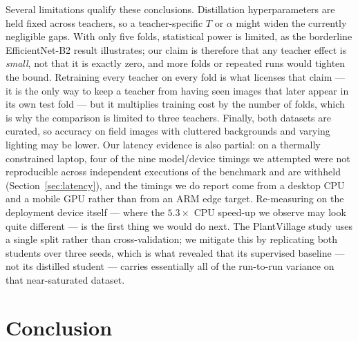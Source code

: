 \documentclass[conference]{IEEEtran}
\begin{document}
Several limitations qualify these conclusions. Distillation hyperparameters are
held fixed across teachers, so a teacher-specific $T$ or $\alpha$ might widen the
currently negligible gaps. With only five folds, statistical power is limited, as
the borderline EfficientNet-B2 result illustrates; our claim is therefore that
any teacher effect is \emph{small}, not that it is exactly zero, and more folds
or repeated runs would tighten the bound. Retraining every teacher on every fold
is what licenses that claim --- it is the only way to keep a teacher from having
seen images that later appear in its own test fold --- but it multiplies training
cost by the number of folds, which is why the comparison is limited to three
teachers. Finally, both datasets are curated, so accuracy on field images with
cluttered backgrounds and varying lighting may be lower. Our latency evidence is
also partial: on a thermally constrained laptop, four of the nine model/device
timings we attempted were not reproducible across independent executions of the
benchmark and are withheld (Section~\ref{sec:latency}), and the timings we do
report come from a desktop CPU and a mobile GPU rather than from an ARM edge
target. Re-measuring on the deployment device itself --- where the $5.3\times$
CPU speed-up we observe may look quite different --- is the first thing we would
do next.
The PlantVillage study uses a single split rather than
cross-validation; we mitigate this by replicating both students over three seeds,
which is what revealed that its supervised baseline --- not its distilled student
--- carries essentially all of the run-to-run variance on that near-saturated
dataset.

\section{Conclusion}
\end{document}
